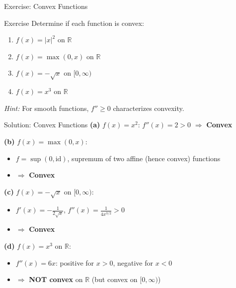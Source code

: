 \documentclass[aspectratio=169]{beamer}
\newcommand{\R}{\mathbb{R}}
\begin{document}
\begin{frame}{Exercise: Convex Functions}
\begin{block}{Exercise}
Determine if each function is convex:
\begin{enumerate}
    \item[(a)] $f(x) = |x|^2$ on $\R$
    \item[(b)] $f(x) = \max(0, x)$ on $\R$
    \item[(c)] $f(x) = -\sqrt{x}$ on $[0, \infty)$
    \item[(d)] $f(x) = x^3$ on $\R$
\end{enumerate}
\end{block}

\vspace{0.3cm}
\textit{Hint:} For smooth functions, $f'' \geq 0$ characterizes convexity.
\end{frame}

\begin{frame}{Solution: Convex Functions}
\textbf{(a)} $f(x) = x^2$: \quad $f''(x) = 2 > 0$ \quad $\Rightarrow$ \textbf{Convex} \checkmark

\vspace{0.3cm}
\textbf{(b)} $f(x) = \max(0, x)$:
\begin{itemize}
    \item $f = \sup(0, \text{id})$, supremum of two affine (hence convex) functions
    \item $\Rightarrow$ \textbf{Convex} \checkmark
\end{itemize}

\vspace{0.3cm}
\textbf{(c)} $f(x) = -\sqrt{x}$ on $[0, \infty)$:
\begin{itemize}
    \item $f'(x) = -\frac{1}{2\sqrt{x}}$, \quad $f''(x) = \frac{1}{4x^{3/2}} > 0$
    \item $\Rightarrow$ \textbf{Convex} \checkmark
\end{itemize}

\vspace{0.3cm}
\textbf{(d)} $f(x) = x^3$ on $\R$:
\begin{itemize}
    \item $f''(x) = 6x$: positive for $x > 0$, negative for $x < 0$
    \item $\Rightarrow$ \textbf{NOT convex} on $\R$ (but convex on $[0, \infty)$)
\end{itemize}
\end{frame}
\end{document}

